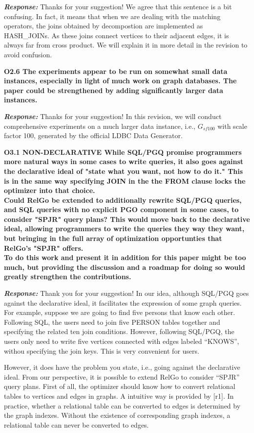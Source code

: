 \textbf{\textit{Response: }}
Thanks for your suggestion! We agree that this sentence is a bit confusing. In fact, it means that when we are dealing with the matching operators, the joins obtained by decompostion are implemented as HASH\_JOINs. As these joins connect vertices to their adjacent edges, it is always far from cross product. We will explain it in more detail in the revision to avoid confusion.


\textbf{
O2.6 The experiments appear to be run on somewhat small data instances, especially in light of much work on graph databases. The paper could be strengthened by adding significantly larger data instances.}

\textbf{\textit{Response: }}
Thanks for your suggestion! In this revision, we will conduct comprehensive experiments on a much larger data instance, i.e., $G_{sf100}$ with scale factor 100, generated by the official LDBC Data Generator.


\textbf{O3.1 NON-DECLARATIVE
While SQL/PGQ promise programmers more natural ways in some cases to write queries, it also goes against the declarative ideal of "state what you want, not how to do it." This is in the same way specifying JOIN in the the FROM clause locks the optimizer into that choice. \\
Could RelGo be extended to additionally rewrite SQL/PGQ queries, and SQL queries with no explicit PGO component in some cases, to consider "SPJR" query plans? This would move back to the declarative ideal, allowing programmers to write the queries they way they want, but bringing in the full array of optimization opportunties that RelGo's "SPJR" offers. \\
To do this work and present it in addition for this paper might be too much, but providing the discussion and a roadmap for doing so would greatly strengthen the contributions.}

\textbf{\textit{Response: }}
Thank you for your suggestion! 
In our idea, although SQL/PGQ goes against the declarative ideal, it facilitates the expression of some graph queries.
For example, suppose we are going to find five persons that know each other.
Following SQL, the users need to join five PERSON tables together and specifying the related ten join conditions.
However, following SQL/PGQ, the users only need to write five vertices connected with edges labeled ``KNOWS'', withou specifying the join keys.
This is very convenient for users.

However, it does have the problem you state, i.e., going against the declarative ideal.
From our perspective, it is possible to extend RelGo to consider ``SPJR'' query plans.
First of all, the optimizer should know how to convert relational tables to vertices and edges in graphs.
A intuitive way is provided by [r1].
In practice, whether a relational table can be converted to edges is determined by the graph indexes.
Without the existence of corresponding graph indexes, a relational table can never be converted to edges.

